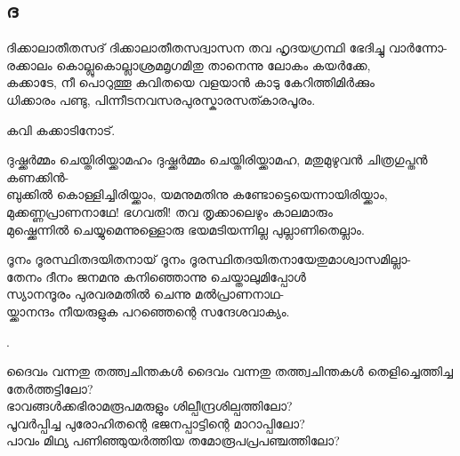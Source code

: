 \subsection{ദ}
\begin{enumerate}


\begin{slokam}{\VSr}{\NKD}{ദിക്കാലാതീതസദ്}
ദിക്കാലാതീതസദ്വാസന തവ ഹൃദയഗ്രന്ഥി ഭേദിച്ചു വാർന്നോ-\\
രക്കാലം കൊല്ലുകൊല്ലാശ്രമമൃഗമിതു താനെന്നു ലോകം കയർക്കേ,\\
കക്കാടേ, നീ പൊറുത്തൂ കവിതയെ വളയാൻ കാടു കേറിത്തിമിർക്കും\\
ധിക്കാരം പണ്ടു, പിന്നീടനവസരപുരസ്കാരസത്കാരപൂരം.
\end{slokam}


കവി കക്കാടിനോട്. 


\begin{slokam}{\VSr}{\ONN}{ദുഷ്ക്കർമ്മം ചെയ്തിരിയ്ക്കാമഹം}
ദുഷ്ക്കർമ്മം ചെയ്തിരിയ്ക്കാമഹ, മതുമുഴുവൻ ചിത്രഗുപ്തൻ കണക്കിൻ-\\
ബുക്കിൽ കൊള്ളിച്ചിരിയ്ക്കാം, യമനുമതിനു കണ്ടോട്ടെയെന്നായിരിയ്ക്കാം,\\
മുക്കണ്ണപ്രാണനാഥേ! ഭഗവതി! തവ തൃക്കാലെഴും കാലമാരും\\
മുഷ്ക്കെന്നിൽ ചെയ്യുമെന്നുള്ളൊരു ഭയമടിയന്നില്ല പുല്ലാണിതെല്ലാം.

\end{slokam}


\begin{slokam}{\VMk}{\KV}{ദൂനം ദൂരസ്ഥിതദയിതനായ്}
ദൂനം ദൂരസ്ഥിതദയിതനായേതുമാശ്വാസമില്ലാ-\\
തേനം ദീനം ജനമനു കനി‍ഞ്ഞൊന്നു ചെയ്താലുമിപ്പോൾ \\
സ്യാനന്ദൂരം പുരവരമതിൽ ചെന്നു മൽപ്രാണനാഥ-\\
യ്ക്കാനന്ദം നീയരുളുക പറഞ്ഞെന്റെ സന്ദേശവാക്യം.
\end{slokam}


.

\begin{slokam}{\VSv}{\VRV}{ദൈവം വന്നതു തത്ത്വചിന്തകൾ}
 ദൈവം വന്നതു തത്ത്വചിന്തകൾ തെളിച്ചെത്തിച്ച തേർത്തട്ടിലോ?\\
ഭാവങ്ങൾക്കഭിരാമരൂപമരുളും ശില്പീന്ദ്രശില്പത്തിലോ?\\
പൂവർപ്പിച്ച പുരോഹിതന്റെ ഭജനപ്പാട്ടിന്റെ മാറാപ്പിലോ?\\
പാവം മിഥ്യ പണിഞ്ഞുയർത്തിയ തമോരൂപപ്രപഞ്ചത്തിലോ?
\end{slokam}



\end{enumerate}

